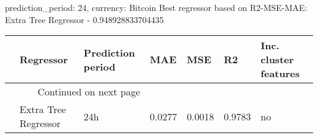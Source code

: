 
prediction_period: 24, currency: Bitcoin
Best regressor based on R2-MSE-MAE: Extra Tree Regressor - 0.948928833704435
\begin{longtable}{lllllll}
\toprule
{} &             Regressor & Prediction period &     MAE &     MSE &      R2 & Inc. cluster features \\
\midrule
\endhead
\midrule
\multicolumn{3}{r}{{Continued on next page}} \\
\midrule
\endfoot

\bottomrule
\endlastfoot
0 &  Extra Tree Regressor &               24h &  0.0277 &  0.0018 &  0.9783 &                    no \\
\end{longtable}
